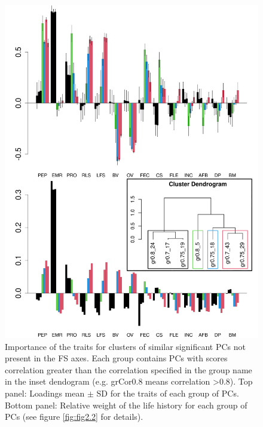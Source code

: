 \begin{figure}
\centering
\includegraphics[width=\textwidth]{./Figures/chapter02/fig3-Secondary axes.png}
\caption[Alternative axes groups and PC loadings]{
Importance of the traits for clusters of similar significant PCs not present in 
the FS axes. Each group contains PCs with scores correlation greater than the 
correlation specified in the group name in the inset dendogram (e.g. grCor0.8 
means correlation \textgreater{0.8}). Top panel: Loadings mean $\pm$ SD for the 
traits of each group of PCs. Bottom panel: Relative weight of the life history
for each group of PCs (see figure \ref{fig:fig2.2} for details).}
\label{fig:fig2.3}
\end{figure}

